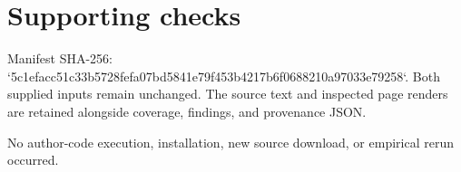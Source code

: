 \documentclass[10pt]{article}
\begin{document}
\section*{Supporting checks}
Manifest SHA-256: `5c1efacc51c33b5728fefa07bd5841e79f453b4217b6f0688210a97033e79258`. Both supplied inputs remain unchanged. The source text and inspected page renders are retained alongside coverage, findings, and provenance JSON.\par
No author-code execution, installation, new source download, or empirical rerun occurred.\par
\end{document}
